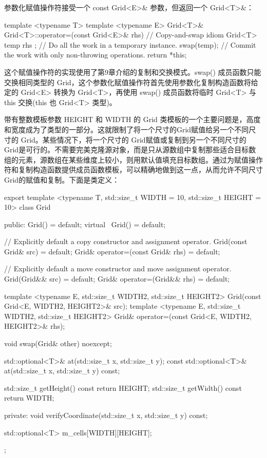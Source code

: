 参数化赋值操作符接受一个 const Grid<E>\& 参数，但返回一个 Grid<T>\&：

\begin{cpp}
template <typename T>
template <typename E>
Grid<T>& Grid<T>::operator=(const Grid<E>& rhs)
{
    // Copy-and-swap idiom
    Grid<T> temp { rhs }; // Do all the work in a temporary instance.
    swap(temp); // Commit the work with only non-throwing operations.
    return *this;
}
\end{cpp}

这个赋值操作符的实现使用了第9章介绍的复制和交换模式。swap() 成员函数只能交换相同类型的 Grid，这个参数化赋值操作符首先使用参数化复制构造函数将给定的 Grid<E> 转换为 Grid<T>，再使用 swap() 成员函数将临时 Grid<T> 与 this 交换(this 也 Grid<T> 类型)。


带有整数模板参数 HEIGHT 和 WIDTH 的 Grid 类模板的一个主要问题是，高度和宽度成为了类型的一部分。这就限制了将一个尺寸的Grid赋值给另一个不同尺寸的 Grid。某些情况下，将一个尺寸的 Grid赋值或复制到另一个不同尺寸的 Grid是可行的。不需要完美克隆源对象，而是只从源数组中复制那些适合目标数组的元素，源数组在某些维度上较小，则用默认值填充目标数组。通过为赋值操作符和复制构造函数提供成员函数模板，可以精确地做到这一点，从而允许不同尺寸 Grid的赋值和复制。下面是类定义：

\begin{cpp}
export template <typename T, std::size_t WIDTH = 10, std::size_t HEIGHT = 10>
class Grid
{
    public:
        Grid() = default;
        virtual ~Grid() = default;

        // Explicitly default a copy constructor and assignment operator.
        Grid(const Grid& src) = default;
        Grid& operator=(const Grid& rhs) = default;

        // Explicitly default a move constructor and move assignment operator.
        Grid(Grid&& src) = default;
        Grid& operator=(Grid&& rhs) = default;

        template <typename E, std::size_t WIDTH2, std::size_t HEIGHT2>
        Grid(const Grid<E, WIDTH2, HEIGHT2>& src);
        template <typename E, std::size_t WIDTH2, std::size_t HEIGHT2>
        Grid& operator=(const Grid<E, WIDTH2, HEIGHT2>& rhs);

        void swap(Grid& other) noexcept;

        std::optional<T>& at(std::size_t x, std::size_t y);
        const std::optional<T>& at(std::size_t x, std::size_t y) const;

        std::size_t getHeight() const { return HEIGHT; }
        std::size_t getWidth() const { return WIDTH; }

    private:
        void verifyCoordinate(std::size_t x, std::size_t y) const;

        std::optional<T> m_cells[WIDTH][HEIGHT];
};
\end{cpp}

